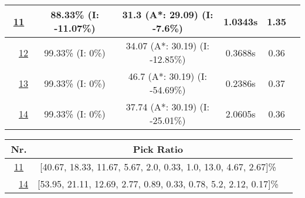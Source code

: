 \begin{table}[h!]
\begin{tabular}{|cc|c|c|c|c|c|}
\hline
\hline
\multicolumn{2}{|c|}{\cellcolor{orange!40} \hyperref[tab: evalalgorithms]{11}} & 88.33\% (I: -11.07\%) & 31.3 (A*: 29.09) (I: -7.6\%) & 1.0343s & 1.35\\
\hline
\hline
\multicolumn{1}{|M{0.15cm}}{\cellcolor{cyan!40}} & \multicolumn{1}{M{0.15cm}|}{\cellcolor{blue!40} \hspace*{-0.5cm}\hyperref[tab: evalalgorithms]{12}} & 99.33\% (I: 0\%) & 34.07 (A*: 30.19) (I: -12.85\%) & 0.3688s & 0.36\\
\hline
\multicolumn{1}{|M{0.15cm}}{\cellcolor{cyan!40}} & \multicolumn{1}{M{0.15cm}|}{\cellcolor{red!40} \hspace*{-0.5cm}\hyperref[tab: evalalgorithms]{13}} & 99.33\% (I: 0\%) & 46.7 (A*: 30.19) (I: -54.69\%) & 0.2386s & 0.37\\
\hline
\multicolumn{1}{|M{0.15cm}}{\cellcolor{cyan!40}} & \multicolumn{1}{M{0.15cm}|}{\cellcolor{orange!40} \hspace*{-0.5cm}\hyperref[tab: evalalgorithms]{14}} & 99.33\% (I: 0\%) & 37.74 (A*: 30.19) (I: -25.01\%) & 2.0605s & 0.36\\
\hline
\end{tabular}


\bigskip

\begin{tabular}{|cc|c|c|}
\hline
\multicolumn{2}{|c|}{\textbf{Nr.}} & \textbf{Pick Ratio}\\
\hline
\hline
\multicolumn{2}{|c|}{\cellcolor{orange!40} \hyperref[tab: evalalgorithms]{11}} & [40.67, 18.33, 11.67, 5.67, 2.0, 0.33, 1.0, 13.0, 4.67, 2.67]\%\\
\hline
\hline
\multicolumn{1}{|M{0.15cm}}{\cellcolor{cyan!40}} & \multicolumn{1}{M{0.15cm}|}{\cellcolor{orange!40} \hspace*{-0.5cm}\hyperref[tab: evalalgorithms]{14}} & [53.95, 21.11, 12.69, 2.77, 0.89, 0.33, 0.78, 5.2, 2.12, 0.17]\%\\
\hline
\end{tabular}


\bigskip


\end{table}
